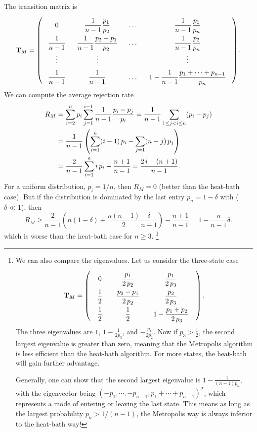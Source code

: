 \documentclass[12pt]{article}
\begin{document}
The transition matrix is
$$
\mathbf T_M =
\left(
  \arraycolsep=8.0pt\def\arraystretch{2.0}
  \begin{array}{cccccc}
    0   & \dfrac{1}{n-1}\dfrac{p_1}{p_2} & \dots & \dfrac{1}{n-1}\dfrac{p_1}{p_n} \\
    \dfrac{1}{n-1} & \dfrac{1}{n-1}\dfrac{p_2-p_1}{p_2} & \dots & \dfrac{1}{n-1}\dfrac{p_2}{p_n} \\
    \vdots & \vdots  &  & \vdots \\
    \dfrac{1}{n-1} & \dfrac{1}{n-1} & \dots & 1 - \dfrac{1}{n-1}\dfrac{p_1 + \cdots + p_{n-1}}{p_n}
  \end{array}
\right).
$$
We can compute the average rejection rate
\begin{align}
  R_M
  &= \sum_{i = 2}^n p_i \sum_{j = 1}^{i-1} \frac{1}{n-1} \frac{p_i - p_j} { p_i }
  = \frac{1}{n-1} \sum_{1 \le j < i \le n} (p_i - p_j)
  \notag \\
  &= \frac{1}{n-1} \left( \sum_{i=1}^n (i - 1) \, p_i - \sum_{j = 1} (n - j) \, p_j \right)
  \notag \\
  &= \frac{2}{n-1} \sum_{i=1}^n i \, p_i - \frac{n+1}{n-1}
  = \frac{ 2 \, \overline i - (n + 1) } { n - 1 }.
\label{eq:rejection_Metropolis}
\end{align}
For a uniform distribution, $p_i = 1/n$, then $R_M = 0$
(better than the heat-bath case).
But if the distribution is dominated by
the last entry $p_n = 1 - \delta$
with ($\delta \ll 1$),
then
$$
R_M \ge \frac{2}{n-1}
\left( n (1 - \delta) + \frac{n(n-1)}{2} \frac{\delta}{n-1} \right)
- \frac{ n + 1 } { n - 1 } = 1 - \frac{n}{n-1}\delta.
$$
which is worse than the heat-bath case for $n \ge 3$.
%
\footnote{
We can also compare the eigenvalues.
Let us consider the three-state case
$$
\mathbf T_M =
\left(
  \arraycolsep=10.0pt\def\arraystretch{2.0}
  \begin{array}{cccccc}
    0   & \dfrac{p_1}{2 \, p_2} & \dfrac{p_1}{2 \, p_3} \\
    \dfrac{1}{2} & \dfrac{p_2-p_1}{2 \, p_2} & \dfrac{p_2}{2 \, p_3} \\
    \dfrac{1}{2} & \dfrac{1}{2} & 1 - \dfrac{p_1 + p_{2}}{2 \, p_3}
  \end{array}
\right).
$$
The three eigenvalues are
$1$, $1 - \frac{1}{2 p_3}$, and $-\frac{p_1}{2 p_2}$.
%
Now if $p_3 > \frac{1}{2}$, the second largest eigenvalue
is greater than zero, meaning that the Metropolis algorithm
is less efficient than the heat-bath algorithm.
For more states, the heat-bath will gain further advantage.

Generally, one can show that
the second largest eigenvalue is $1- \frac{1}{(n-1)p_n}$,
with the eigenvector being
$(-p_1, \cdots, -p_{n-1}, p_1 + \cdots + p_{n-1})^T$,
which represents a mode of entering or leaving the last state.
This means as long as the largest probability $p_n > 1/(n-1)$,
the Metropolis way is always inferior to the heat-bath way!
}
\end{document}
